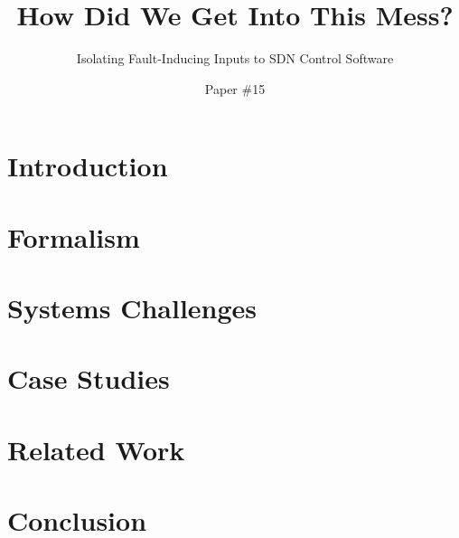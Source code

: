 \documentclass{sig-alt-hotnets}
\begin{document}
    \date{}

\title{How Did We Get Into This Mess?}
\subtitle{Isolating Fault-Inducing Inputs to SDN Control Software}

\author{Paper \#15}

\date{}
    \maketitle
    \thispagestyle{empty}

\abstract{{\it }}

\section{Introduction}
\label{sec:intro}


\section{Formalism}
\label{sec:formalism}


\section{Systems Challenges}
\label{sec:systems_challenges}


\section{Case Studies}
\label{sec:casestudies}


%

\section{Related Work}
\label{sec:related_work}


\section{Conclusion}
\label{sec:conclusion}


 \small 

%
\end{document}
